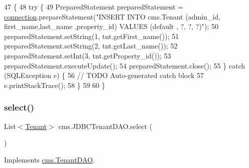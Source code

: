 \begin{DoxyCode}
47                                    \{
48         \textcolor{keywordflow}{try} \{
49             PreparedStatement preparedStatement = \mbox{\hyperlink{classcms_1_1_j_d_b_c_tenant_d_a_o_a08dc3f2801dc5348c6473632b342d62a}{connection}}.prepareStatement(\textcolor{stringliteral}{"INSERT INTO
       cms.Tenant (admin\_id, first\_name,last\_name ,property\_id) VALUES (default , ?, ?, ?)"});
50             preparedStatement.setString(1,  tnt.getFirst\_name());
51             preparedStatement.setString(2,  tnt.getLast\_name());
52             preparedStatement.setInt(3,  tnt.getProperty\_id());
53             preparedStatement.executeUpdate();
54             preparedStatement.close();
55         \} \textcolor{keywordflow}{catch} (SQLException e) \{
56             \textcolor{comment}{// TODO Auto-generated catch block}
57             e.printStackTrace();
58         \}
59          
60     \}
\end{DoxyCode}
\mbox{\label{classcms_1_1_j_d_b_c_tenant_d_a_o_ac021642b8b94d054fbdc74cd87b4a98d}} 
\subsubsection{\texorpdfstring{select()}{select()}}
{\footnotesize\ttfamily List$<$\mbox{\hyperlink{classcms_1_1_tenant}{Tenant}}$>$ cms.\+J\+D\+B\+C\+Tenant\+D\+A\+O.\+select (\begin{DoxyParamCaption}{ }\end{DoxyParamCaption})\hspace{0.3cm}{\ttfamily [inline]}}



Implements \mbox{\hyperlink{interfacecms_1_1_tenant_d_a_o_ab87faa632f84a2592f6f1b9bcb1ef2fe}{cms.\+Tenant\+D\+AO}}.


